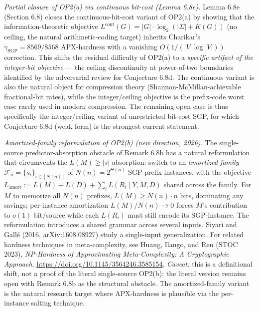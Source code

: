 \documentclass[
]{article}
\begin{document}
\begin{itemize}
  \emph{Partial closure of OP2(a) via continuous bit-cost (Lemma 6.8e).}
  Lemma 6.8e (Section 6.8) closes the continuous-bit-cost variant of
  OP2(a) by showing that the information-theoretic objective
  $L^{\mathrm{cont}}(G) = |G| \cdot \log_2(|\Sigma| + K(G))$
  (no ceiling, the natural arithmetic-coding target) inherits Charikar's
  $\gamma_{\mathrm{SGP}} = 8569/8568$ APX-hardness with a vanishing
  $O(1/(|V|\log|V|))$ correction. This shifts the residual difficulty
  of OP2(a) to a \emph{specific artifact of the integer-bit objective}
  --- the ceiling discontinuity at power-of-two boundaries identified
  by the adversarial review for Conjecture 6.8d. The
  continuous variant is also the natural object for compression theory
  (Shannon-McMillan-achievable fractional-bit rates), while the
  integer/ceiling objective is the prefix-code worst case rarely
  used in modern compression. The remaining open case is thus
  specifically the integer/ceiling variant of unrestricted bit-cost SGP,
  for which Conjecture 6.8d (weak form) is the strongest current
  statement.

  \emph{Amortized-family reformulation of OP2(b) (new direction,
  2026).} The single-source predictor-absorption obstacle of
  Remark 6.8b has a natural reformulation that circumvents the
  $L(M) \geq |s|$ absorption: switch to an \emph{amortized family}
  $\mathcal{F}_n = \{s_i\}_{i \in [N(n)]}$ of $N(n) = 2^{\Theta(n)}$
  SGP-prefix instances, with the objective
  $L_{\mathrm{amort}} := L(M) + L(D) + \sum_i L(R_i \mid Y, M, D)$
  shared across the family. For $M$ to memorize all $N(n)$ prefixes,
  $L(M) \geq N(n) \cdot n$ bits, dominating any savings; per-instance
  amortization $L(M)/N(n) \to 0$ forces $M$'s contribution to
  $o(1)$ bit/source while each $L(R_i)$ must still encode its SGP-instance.
  The reformulation introduces a shared grammar across several inputs.
  Siyari and Gall\'e (2016, arXiv:1608.08927) study a single-input
  generalization. For related hardness techniques in meta-complexity, see
  Huang, Ilango, and Ren (STOC 2023), \emph{NP-Hardness of Approximating
  Meta-Complexity: A Cryptographic Approach},
  \url{https://doi.org/10.1145/3564246.3585154}. \emph{Caveat:} this is a definitional shift,
  not a proof of the literal single-source OP2(b); the literal version
  remains open with Remark 6.8b as the structural obstacle. The
  amortized-family variant is the natural research target where
  APX-hardness is plausible via the per-instance salting technique.


\end{itemize}
\end{document}
